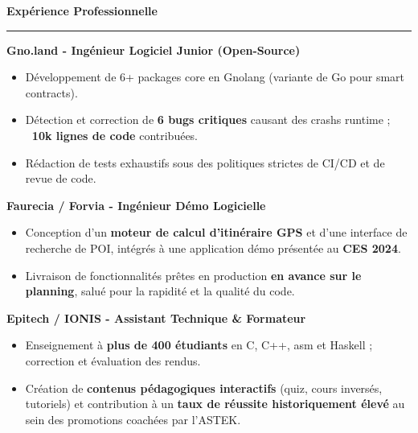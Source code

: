 \documentclass[9pt]{extarticle}
\begin{document}
\par\vspace{5pt}

{\large\bfseries Expérience Professionnelle}
\par\vspace{-8pt}
\rule{\linewidth}{0.4pt}
\par\vspace{5pt}

{\bfseries Gno.land - Ingénieur Logiciel Junior (Open-Source)}
\begin{itemize}[noitemsep, topsep=0pt]
	\item Développement de 6+ packages core en Gnolang (variante de Go pour smart contracts).
	\item Détection et correction de {\bfseries 6 bugs critiques} causant des crashs runtime ; {\bfseries ~10k lignes de code} contribuées.
	\item Rédaction de tests exhaustifs sous des politiques strictes de CI/CD et de revue de code.
\end{itemize}

\par\vspace{5pt}

{\bfseries Faurecia / Forvia - Ingénieur Démo Logicielle}
\begin{itemize}[noitemsep, topsep=0pt]
	\item Conception d'un {\bfseries moteur de calcul d'itinéraire GPS} et d'une interface de recherche de POI, intégrés à une application démo présentée au {\bfseries CES 2024}.
	\item Livraison de fonctionnalités prêtes en production {\bfseries en avance sur le planning}, salué pour la rapidité et la qualité du code.
\end{itemize}

\par\vspace{5pt}

{\bfseries Epitech / IONIS - Assistant Technique \& Formateur}
\begin{itemize}[noitemsep, topsep=0pt]
	\item Enseignement à {\bfseries plus de 400 étudiants} en C, C++, asm et Haskell ; correction et évaluation des rendus.
	\item Création de {\bfseries contenus pédagogiques interactifs} (quiz, cours inversés, tutoriels) et contribution à un {\bfseries taux de réussite historiquement élevé} au sein des promotions coachées par l'ASTEK.
\end{itemize}
\end{document}
